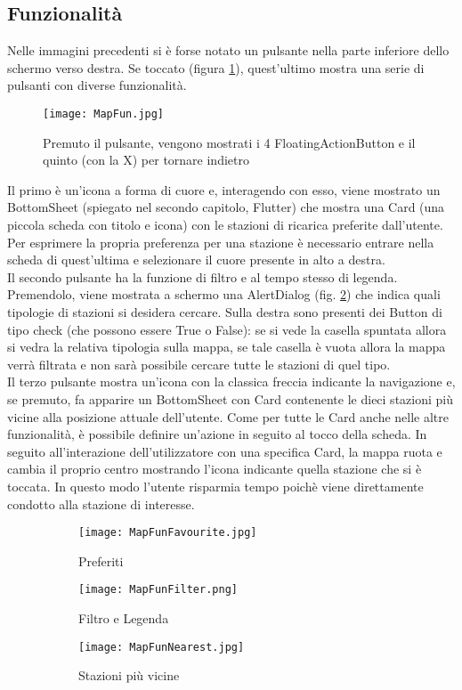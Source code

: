 \subsection{Funzionalità}
Nelle immagini precedenti si è forse notato un pulsante nella parte inferiore
dello schermo verso destra. Se toccato (figura \ref{4puls}), quest'ultimo mostra una serie di
pulsanti con diverse funzionalità. 
\begin{figure}
    \centering
    \texttt{[image: MapFun.jpg]}
    \caption{Premuto il pulsante, vengono mostrati i 4 FloatingActionButton e il quinto (con la X) per tornare indietro}
    \label{4puls}
\end{figure}
Il primo è un'icona a forma di cuore e,
interagendo con esso, viene mostrato un BottomSheet (spiegato nel secondo
capitolo, Flutter) che mostra una Card (una piccola scheda con titolo e icona)
con le stazioni di ricarica preferite dall'utente. Per esprimere la propria
preferenza per una stazione è necessario entrare nella scheda di quest'ultima e
selezionare il cuore presente in alto a destra. \\
Il secondo pulsante ha la funzione di filtro e al tempo stesso di legenda.
Premendolo, viene mostrata a schermo una AlertDialog (fig. \ref{filtro}) che indica quali
tipologie di stazioni si desidera cercare. Sulla destra sono presenti dei Button
di tipo check (che possono essere True o False): se si vede la casella spuntata
allora si vedra la relativa tipologia sulla mappa, se tale casella è vuota
allora la mappa verrà filtrata e non sarà possibile cercare tutte le stazioni di
quel tipo. \\
Il terzo pulsante mostra un'icona con la classica freccia indicante la
navigazione e, se premuto, fa apparire un BottomSheet con Card contenente le
dieci stazioni più vicine alla posizione attuale dell'utente. Come per tutte le
Card anche nelle altre funzionalità, è possibile definire un'azione in seguito
al tocco della scheda. In seguito all'interazione dell'utilizzatore con una
specifica Card, la mappa ruota e cambia il proprio centro mostrando l'icona
indicante quella stazione che si è toccata. In questo modo l'utente risparmia
tempo poichè viene direttamente condotto alla stazione di interesse.
\begin{figure}[h!]
    \centering
    \begin{subfigure}{0.3\linewidth}
        \texttt{[image: MapFunFavourite.jpg]}
        \caption{Preferiti}
    \end{subfigure}
    \begin{subfigure}{0.3\linewidth}
        \texttt{[image: MapFunFilter.png]}
        \caption{Filtro e Legenda}
        \label{filtro}
    \end{subfigure}
    \begin{subfigure}{0.3\linewidth}
        \texttt{[image: MapFunNearest.jpg]}
        \caption{Stazioni più vicine}
    \end{subfigure}
    \caption{}
\end{figure}

